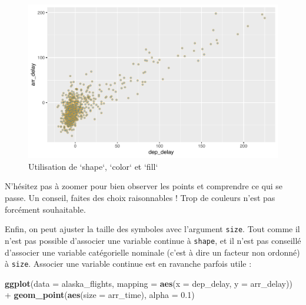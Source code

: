 \documentclass[a4paperpaper,]{article}
\newenvironment{Shaded}{\begin{snugshade}}{\end{snugshade}}
\newcommand{\DataTypeTok}[1]{\textcolor[rgb]{0.00,0.34,0.68}{#1}}
\newcommand{\FloatTok}[1]{\textcolor[rgb]{0.69,0.50,0.00}{#1}}
\newcommand{\KeywordTok}[1]{\textcolor[rgb]{0.12,0.11,0.11}{\textbf{#1}}}
\newcommand{\NormalTok}[1]{\textcolor[rgb]{0.12,0.11,0.11}{#1}}
\newcommand{\OperatorTok}[1]{\textcolor[rgb]{0.12,0.11,0.11}{#1}}
\newcommand{\StringTok}[1]{\textcolor[rgb]{0.75,0.01,0.01}{#1}}
\theoremstyle{definition}
\theoremstyle{definition}
\theoremstyle{definition}
\theoremstyle{remark}
\begin{document}
\begin{figure}[htpb]

{\centering \includegraphics[width=0.9\linewidth]{figure/shapecolorplot-1} 

}

\caption{Utilisation de `shape`, `color` et `fill`}\label{fig:shapecolorplot}
\end{figure}

N'hésitez pas à zoomer pour bien observer les points et comprendre ce
qui se passe. Un conseil, faites des choix raisonnables ! Trop de
couleurs n'est pas forcément souhaitable.

Enfin, on peut ajuster la taille des symboles avec l'argument
\texttt{size}. Tout comme il n'est pas possible d'associer une variable
continue à \texttt{shape}, et il n'est pas conseillé d'associer une
variable catégorielle nominale (c'est à dire un facteur non ordonné) à
\texttt{size}. Associer une variable continue est en ravanche parfois
utile :

\begin{Shaded}
\begin{Highlighting}[]
\KeywordTok{ggplot}\NormalTok{(}\DataTypeTok{data =}\NormalTok{ alaska_flights, }\DataTypeTok{mapping =} \KeywordTok{aes}\NormalTok{(}\DataTypeTok{x =}\NormalTok{ dep_delay, }\DataTypeTok{y =}\NormalTok{ arr_delay)) }\OperatorTok{+}
\StringTok{  }\KeywordTok{geom_point}\NormalTok{(}\KeywordTok{aes}\NormalTok{(}\DataTypeTok{size =}\NormalTok{ arr_time), }\DataTypeTok{alpha =} \FloatTok{0.1}\NormalTok{)}
\end{Highlighting}
\end{Shaded}
\end{document}
